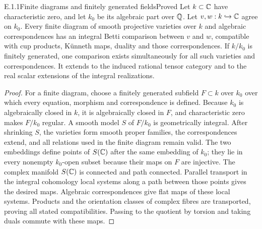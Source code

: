 \begin{result}{E.1.1}{Finite diagrams and finitely generated fields}{Proved}
Let $k\subset\mathbb C$ have characteristic zero, and let $k_0$ be its algebraic part over $\mathbb Q$. Let $v,w:k\hookrightarrow\mathbb C$ agree on $k_0$. Every finite diagram of smooth projective varieties over $k$ and algebraic correspondences has an integral Betti comparison between $v$ and $w$, compatible with cup products, K\"unneth maps, duality and those correspondences. If $k/k_0$ is finitely generated, one comparison exists simultaneously for all such varieties and correspondences. It extends to the induced rational tensor category and to the real scalar extensions of the integral realizations.
\end{result}
\begin{proof}
For a finite diagram, choose a finitely generated subfield $F\subset k$ over $k_0$ over which every equation, morphism and correspondence is defined. Because $k_0$ is algebraically closed in $k$, it is algebraically closed in $F$, and characteristic zero makes $F/k_0$ regular. A smooth model $S$ of $F/k_0$ is geometrically integral. After shrinking $S$, the varieties form smooth proper families, the correspondences extend, and all relations used in the finite diagram remain valid. The two embeddings define points of $S(\mathbb C)$ after the same embedding of $k_0$; they lie in every nonempty $k_0$-open subset because their maps on $F$ are injective. The complex manifold $S(\mathbb C)$ is connected and path connected. Parallel transport in the integral cohomology local systems along a path between those points gives the desired maps. Algebraic correspondences give flat maps of these local systems. Products and the orientation classes of complex fibres are transported, proving all stated compatibilities. Passing to the quotient by torsion and taking duals commute with these maps.


\end{proof}
